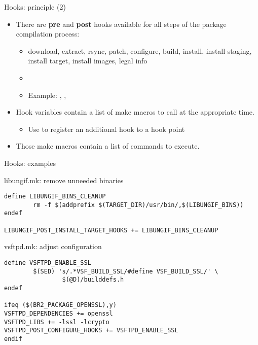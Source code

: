 \begin{frame}{Hooks: principle (2)}
  \begin{itemize}
  \item There are {\bf pre} and {\bf post} hooks available for all
    steps of the package compilation process:
    \begin{itemize}
    \item download, extract, rsync, patch, configure, build, install,
      install staging, install target, install images, legal info
    \item {}
    \item Example: ,
      , 
    \end{itemize}
  \item Hook variables contain a list of make macros to call at the
    appropriate time.
    \begin{itemize}
    \item Use \code{+=} to register an additional hook to a hook point
    \end{itemize}
  \item Those make macros contain a list of commands to execute.
  \end{itemize}
\end{frame}

\begin{frame}[fragile]{Hooks: examples}

\begin{block}{libungif.mk: remove unneeded binaries}
  \begin{verbatim}
define LIBUNGIF_BINS_CLEANUP
        rm -f $(addprefix $(TARGET_DIR)/usr/bin/,$(LIBUNGIF_BINS))
endef

LIBUNGIF_POST_INSTALL_TARGET_HOOKS += LIBUNGIF_BINS_CLEANUP
  \end{verbatim}
\end{block}

\begin{block}{vsftpd.mk: adjust configuration}
  \begin{verbatim}
define VSFTPD_ENABLE_SSL
        $(SED) 's/.*VSF_BUILD_SSL/#define VSF_BUILD_SSL/' \
                $(@D)/builddefs.h
endef

ifeq ($(BR2_PACKAGE_OPENSSL),y)
VSFTPD_DEPENDENCIES += openssl
VSFTPD_LIBS += -lssl -lcrypto
VSFTPD_POST_CONFIGURE_HOOKS += VSFTPD_ENABLE_SSL
endif
  \end{verbatim}
\end{block}

\end{frame}

